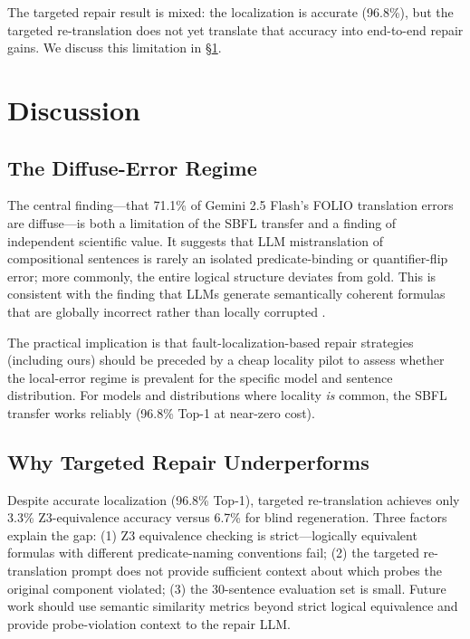 \documentclass[11pt,letterpaper]{article}
\begin{document}
The targeted repair result is mixed: the localization is accurate (96.8\%), but the targeted re-translation does not yet translate that accuracy into end-to-end repair gains. We discuss this limitation in \S\ref{sec:discussion}.

\section{Discussion}
\label{sec:discussion}

\subsection{The Diffuse-Error Regime}

The central finding—that 71.1\% of Gemini 2.5 Flash's FOLIO translation errors are diffuse—is both a limitation of the SBFL transfer and a finding of independent scientific value. It suggests that LLM mistranslation of compositional sentences is rarely an isolated predicate-binding or quantifier-flip error; more commonly, the entire logical structure deviates from gold. This is consistent with the finding that LLMs generate semantically coherent formulas that are globally incorrect rather than locally corrupted \citep{Olausson2023,Ryu2025,Pei2025}.

The practical implication is that fault-localization-based repair strategies (including ours) should be preceded by a cheap locality pilot to assess whether the local-error regime is prevalent for the specific model and sentence distribution. For models and distributions where locality \emph{is} common, the SBFL transfer works reliably (96.8\% Top-1 at near-zero cost).

\subsection{Why Targeted Repair Underperforms}

Despite accurate localization (96.8\% Top-1), targeted re-translation achieves only 3.3\% Z3-equivalence accuracy versus 6.7\% for blind regeneration. Three factors explain the gap: (1) Z3 equivalence checking is strict—logically equivalent formulas with different predicate-naming conventions fail; (2) the targeted re-translation prompt does not provide sufficient context about which probes the original component violated; (3) the 30-sentence evaluation set is small. Future work should use semantic similarity metrics beyond strict logical equivalence and provide probe-violation context to the repair LLM.
\end{document}
